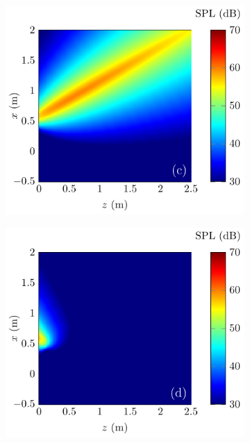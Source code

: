 \begin{figure}[!htb]
\begin{subfigure}{0.35\textwidth}
    \end{subfigure}
    \\
    \begin{subfigure}{0.35\textwidth}
        \centering
        \includegraphics[width = \textwidth]{fig/ComputePalReflectionTruncated_Ultra60000Hz_ByReflectedUltra_211013L.pdf}
    \end{subfigure}
    \begin{subfigure}{0.35\textwidth}
        \centering
        \includegraphics[width = \textwidth]{fig/ComputePalReflectionTruncated_Ultra60000Hz_ByReflectedUltraReflection_211013M.pdf}

\end{subfigure}
\end{figure}
